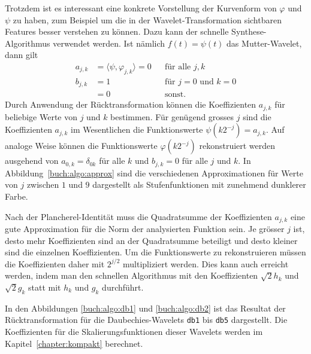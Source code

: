 Trotzdem ist es interessant eine konkrete Vorstellung der Kurvenform
von $\varphi$ und $\psi$ zu haben, zum Beispiel um die in der
Wavelet-Transformation sichtbaren Features besser verstehen
zu können.
Dazu kann der schnelle Synthese-Algorithmus verwendet werden.
Ist nämlich $f(t)=\psi(t)$ das Mutter-Wavelet, dann gilt
\[
\begin{aligned}
a_{j,k}
&=
\langle \psi, \varphi_{j,k}\rangle = 0 
& &\text{für alle $j,k$}
\\
b_{j,k}
&=1&&\text{für $j=0$ und $k=0$}
\\
&=0&&\text{sonst.}
\end{aligned}
\]
Durch Anwendung der Rücktransformation können die Koeffizienten 
$a_{j,k}$ für beliebige Werte von $j$ und $k$ bestimmen.
Für genügend grosses $j$ sind die Koeffizienten $a_{j,k}$ im Wesentlichen
die Funktionswerte $\psi(k2^{-j}) = a_{j,k}$.
Auf analoge Weise können die Funktionswerte $\varphi(k2^{-j})$
rekonstruiert werden ausgehend von $a_{0,k}=\delta_{0k}$ für alle $k$
und $b_{j,k}=0$ für alle $j$ und $k$.
In Abbildung~\ref{buch:algo:approx} sind die verschiedenen Approximationen
für Werte von $j$ zwischen $1$ und $9$ dargestellt als Stufenfunktionen
mit zunehmend dunklerer Farbe.

Nach der Plancherel-Identität muss die Quadratsumme der Koeffizienten
$a_{j,k}$ eine gute Approximation für die Norm der analysierten Funktion
sein.
Je grösser $j$ ist, desto mehr Koeffizienten sind an der Quadratsumme
beteiligt und desto kleiner sind die einzelnen Koeffizienten.
Um die Funktionswerte zu rekonstruieren müssen die Koeffizienten
daher mit $2^{j/2}$ multipliziert werden.
Dies kann auch erreicht werden, indem man den schnellen Algorithmus
mit den Koeffizienten $\sqrt{2} h_k$ und
$\sqrt{2} g_k$ statt mit $h_k$ und $g_k$ durchführt.

In den Abbildungen \ref{buch:algo:db1} und \ref{buch:algo:db2}
ist das Resultat der Rücktransformation für die Daubechies-Wavelets
\texttt{db1} bis \texttt{db5} dargestellt.
Die Koeffizienten für die Skalierungsfunktionen dieser Wavelets werden
im Kapitel~\ref{chapter:kompakt} berechnet.

